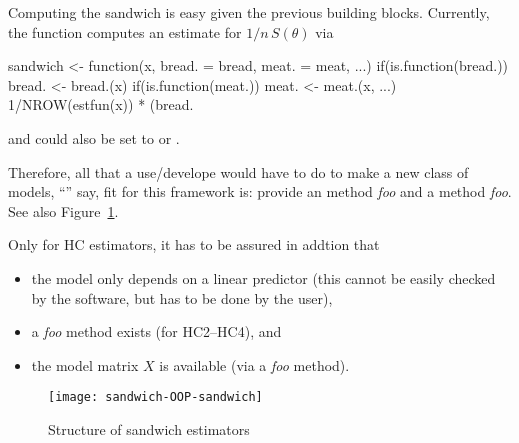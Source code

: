 \documentclass{Z}
\begin{document}
Computing the sandwich is easy given the previous building blocks. Currently, the 
function  computes an estimate for $1/n \, S(\theta)$ via
\begin{Schunk}
\begin{Sinput}
sandwich <- function(x, bread. = bread, meat. = meat, ...)
{
  if(is.function(bread.)) bread. <- bread.(x)
  if(is.function(meat.)) meat. <- meat.(x, ...)
  1/NROW(estfun(x)) * (bread. %*% meat. %*% bread.)
}
\end{Sinput}
\end{Schunk}
and  could also be set to  or . 

Therefore, all that a
use/develope would have to do to make a new class of models, 
``'' say, fit for this framework is: 
provide an  method \emph{foo}\code{()}
and a  method \emph{foo}\code{()}. See also Figure~\ref{fig:sandwich}.

Only for HC estimators, it has to be assured in addtion that 
\begin{itemize}
  \item the model only depends on a linear predictor (this cannot be easily
        checked by the software, but has to be done by the user),
  \item a \emph{foo}\code{()} method exists (for HC2--HC4), and
  \item the model matrix $X$ is available (via a \emph{foo}\code{()} method).
\end{itemize}

\begin{figure}[tbh]
\begin{center}
\texttt{[image: sandwich-OOP-sandwich]}
\caption{\label{fig:sandwich} Structure of sandwich estimators}
\end{center}
\end{figure}


\end{document}
